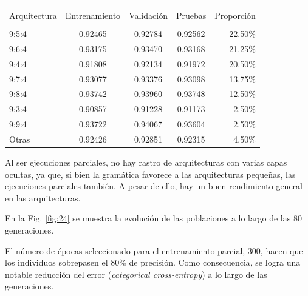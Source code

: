 \documentclass[spanish,a4paper,12pt,twoside]{report}
\begin{document}
\begin{center}
   \label{table}
  \begin{tabular}{l c c c r}
    \hline \\ [-2ex]
    Arquitectura & Entrenamiento & Validación & Pruebas & Proporción \\ [0.5ex]
    \hline \\ [-1ex]
    9:5:4 & 0.92465 & 0.92784 & 0.92562 & 22.50\% \\
    9:6:4 & 0.93175 & 0.93470 & 0.93168 & 21.25\% \\
    9:4:4 & 0.91808 & 0.92134 & 0.91972 & 20.50\% \\
    9:7:4 & 0.93077 & 0.93376 & 0.93098 & 13.75\% \\
    9:8:4 & 0.93742 & 0.93960 & 0.93748 & 12.50\% \\
    9:3:4 & 0.90857 & 0.91228 & 0.91173 & 2.50\% \\
    9:9:4 & 0.93722 & 0.94067 & 0.93604 & 2.50\% \\
    Otras & 0.92426 & 0.92851 & 0.92315 & 4.50\% \\ [1ex]
    \hline
  \end{tabular}
\end{center} \par
  Al ser ejecuciones parciales, no hay rastro de arquitecturas con varias capas ocultas, ya que, si bien la gramática favorece a las arquitecturas pequeñas, las ejecuciones parciales también. A pesar de ello, hay un buen rendimiento general en las arquitecturas. \par
  En la Fig. \ref{fig:24} se muestra la evolución de las poblaciones a lo largo de las 80 generaciones. \par
  El número de épocas seleccionado para el entrenamiento parcial, 300, hacen que los individuos sobrepasen el 80\% de precisión. Como consecuencia, se logra una notable reducción del error (\emph{categorical cross-entropy}) a lo largo de las generaciones.\par
\end{document}
